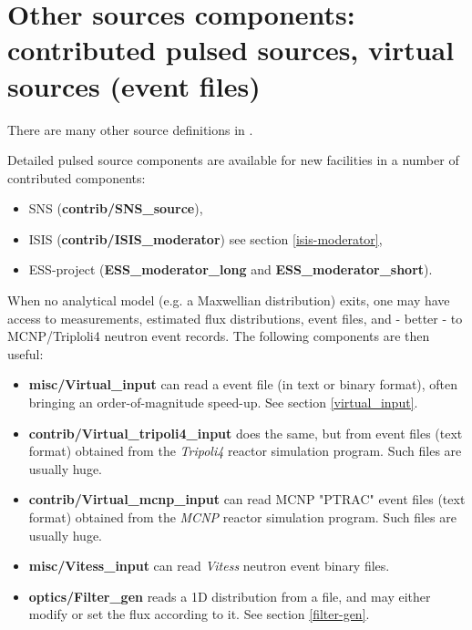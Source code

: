 





\newpage




\newpage




\newpage




\newpage
\section{Other sources components: contributed pulsed sources, virtual sources (event files)}
\label{sources-seealso}

There are many other source definitions in \MCS .

Detailed pulsed source components are available for new facilities
in a number of contributed components:
\begin{itemize}
\item SNS ({\bf contrib/SNS\_source}),
\item ISIS ({\bf contrib/ISIS\_moderator}) see section \ref{isis-moderator},
\item ESS-project ({\bf ESS\_moderator\_long} and {\bf  ESS\_moderator\_short}).
\end{itemize}

When no analytical model (e.g. a Maxwellian distribution) exits,
one may have access to measurements, estimated flux distributions,
event files, and - better - to MCNP/Triploli4 neutron event records.
The following components are then useful:

\begin{itemize}
\item{{\bf misc/Virtual\_input} can read a \MCS event file
(in text or binary format), often bringing an order-of-magnitude speed-up.
See section \ref{virtual_input}.}
\item{{\bf contrib/Virtual\_tripoli4\_input} does the same, but from event files (text format) obtained from the \emph{Tripoli4} \cite{tripoli_webpage} reactor simulation program. Such files are usually huge.}
\item{{\bf contrib/Virtual\_mcnp\_input} can read MCNP "PTRAC" event files (text format) obtained from the \emph{MCNP} \cite{mcnp_webpage} reactor simulation program. Such files are usually huge.}
\item{{\bf misc/Vitess\_input} can read \emph{Vitess} \cite{vitess_webpage} neutron event binary files.}
\item{{\bf optics/Filter\_gen} reads a 1D distribution from a file, and may either modify or set the flux according to it. See section \ref{filter-gen}.}
\end{itemize}
